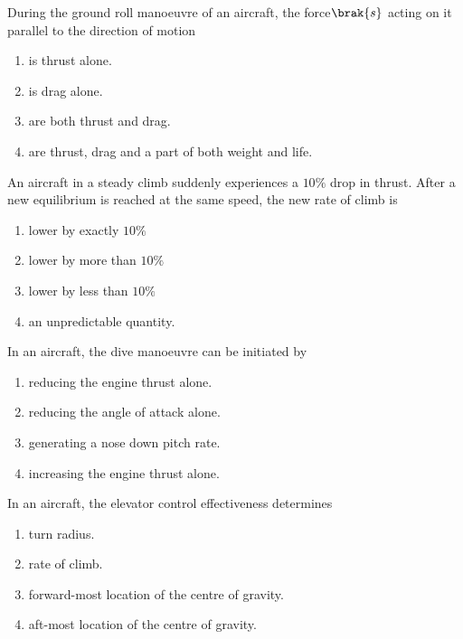 \iffalse
\chapter{2012}
\author{EE24BTECH11003}
\section{ae}
\fi
\item During the ground roll manoeuvre of an aircraft, the force$\brak{s}$ acting on it parallel to the direction of motion
\hfill{}
\begin{enumerate}
\item is thrust alone.
\item is drag alone.
\item are both thrust and drag.
\item are thrust, drag and a part of both weight and life.
\end{enumerate}

\item An aircraft in a steady climb suddenly experiences a $10\%$ drop in thrust. After a new equilibrium is reached at the same speed, the new rate of climb is
\hfill{}
\begin{enumerate}
\item lower by exactly $10\%$
\item lower by more than $10\%$
\item lower by less than $10\%$
\item an unpredictable quantity.
\end{enumerate}

\item In an aircraft, the dive manoeuvre can be initiated by
\hfill{}
\begin{enumerate}
\item reducing the engine thrust alone.
\item reducing the angle of attack alone.
\item generating a nose down pitch rate.
\item increasing the engine thrust alone.
\end{enumerate}

\item In an aircraft, the elevator control effectiveness determines
\hfill{}
\begin{enumerate}
\item turn radius.
\item rate of climb.
\item forward-most location of the centre of gravity.
\item aft-most location of the centre of gravity.
\end{enumerate}

